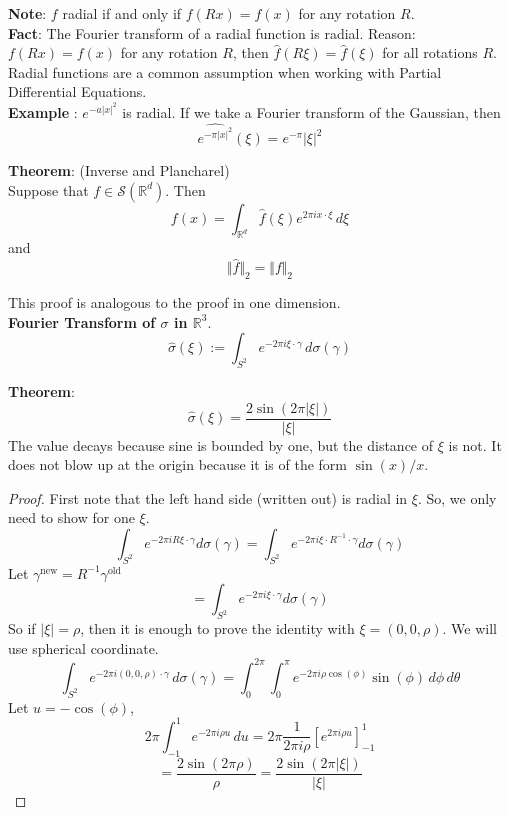 \documentclass[12pt]{article}
\begin{document}
\noindent \textbf{Note}: $f$ radial if and only if $f(Rx) = f(x)$ for any rotation $R$. \\

\noindent \textbf{Fact}: The Fourier transform of a radial function is radial. 
\noindent Reason: $f(Rx) = f(x)$ for any rotation $R$, then $\hat{f}(R\xi) = \hat{f}(\xi)$ for all rotations $R$. \\

\noindent Radial functions are a common assumption when working with Partial Differential Equations. \\

\textbf{Example} : $e^{-a\vert x \vert^2}$ is radial. If we take a Fourier transform of the Gaussian, then
$$\widehat{e^{-\pi\vert x\vert^2}}(\xi) = e^{-\pi} \vert \xi \vert^2$$

\noindent \textbf{Theorem}: (Inverse and Plancharel) \\
\noindent Suppose that $f \in \mathcal{S}(\mathbb{R}^d)$. Then $$ f(x) = \int_{\mathbb{R}^d} \hat{f}(\xi) e^{2\pi i x \cdot \xi} \, d\xi$$
and 
$$\Vert \hat{f} \Vert_2 = \Vert f \Vert_2$$

This proof is analogous to the proof in one dimension. \\

\noindent \textbf{Fourier Transform of $\sigma$ in $\mathbb{R}^3$}. 
$$\hat{\sigma}(\xi) := \int_{S^2} e^{-2\pi i \xi \cdot \gamma} \,d\sigma(\gamma)$$

\noindent \textbf{Theorem}: 
$$\hat{\sigma}(\xi) = \frac{2\sin(2\pi \vert \xi \vert )}{\vert \xi \vert}$$
The value decays because sine is bounded by one, but the distance of $\xi$ is not. It does not blow up at the origin because it is of the form $\sin(x)/x$. 
\begin{proof}
First note that the left hand side (written out) is radial in $\xi$. So, we only need to show for one $\xi$. 
$$\int_{S^2} e^{-2\pi i R \xi \cdot \gamma} d\sigma(\gamma) = \int_{S^2} e^{-2\pi i \xi \cdot R^{-1} \cdot \gamma} d\sigma(\gamma)$$
Let $\gamma^{\text{new}} = R^{-1}\gamma^{\text{old}}$
$$= \int_{S^2} e^{-2\pi i \xi  \cdot \gamma} d\sigma(\gamma)$$
So if $\vert \xi \vert = \rho$, then it is enough to prove the identity with $\xi = (0,0,\rho)$. We will use spherical coordinate. 
$$\int_{S^2} e^{-2\pi i (0,0,\rho) \cdot \gamma} \,d\sigma(\gamma) = \int^{2\pi}_0 \int^\pi_0 e^{-2\pi i \rho \cos (\phi)} \sin(\phi) \,d\phi \,d\theta $$
Let $u = -\cos(\phi)$,
$$ 2\pi \int^1_{-1} e^{-2\pi i \rho u}  \,du = 2\pi \frac{1}{2\pi i \rho} [e^{2\pi i \rho u}]^1_{-1}$$
$$= \frac{2\sin(2\pi \rho)}{\rho} = \frac{2\sin(2\pi \vert  \xi \vert )}{\vert \xi \vert}$$
\end{proof}
\end{document}
